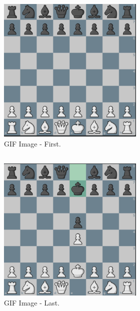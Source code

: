 \documentclass[12pt, a4]{article}
\begin{document}
\subsection*{}
\begin{figure}[h]
\centering
\caption{GIF Image - First.}
\includegraphics[height=7cm, width=7cm]{GIFImages/0.png}
\end{figure}

\subsection*{}
\begin{figure}[h]
\centering
\caption{GIF Image - Last.}
\includegraphics[height=7cm, width=7cm]{GIFImages/12.png}
\end{figure}



\newpage
\end{document}
